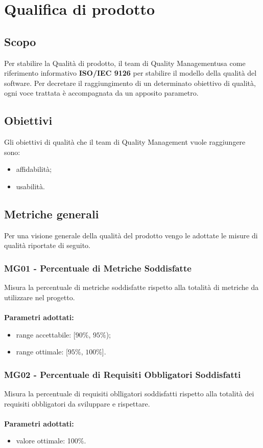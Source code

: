 \section{Qualifica di prodotto}
\subsection{Scopo}
Per stabilire la Qualità di prodotto, il team di Quality Management\glo usa come riferimento informativo \textbf{ISO/IEC 9126} per stabilire il modello della qualità del software. Per decretare il raggiungimento di un determinato obiettivo di qualità, ogni voce trattata è accompagnata da un apposito parametro.
\subsection{Obiettivi}
Gli obiettivi di qualità che il team di Quality Management vuole raggiungere sono:
\begin{itemize}
\item affidabilità;
\item usabilità.
\end{itemize}
\subsection{Metriche generali}
Per una visione generale della qualità del prodotto vengo le adottate le misure di qualità riportate di seguito.
\subsubsection{MG01 - Percentuale di Metriche Soddisfatte}
Misura la percentuale di metriche soddisfatte rispetto alla totalità di metriche da utilizzare nel progetto.\\ \\ 
\textbf{Parametri adottati:} 
\begin{itemize}
\item range accettabile: [$90\%$, $95\%$);
\item range ottimale: [$95\%$, $100\%$].
\end{itemize}
 
\subsubsection{MG02 - Percentuale di Requisiti Obbligatori Soddisfatti}
Misura la percentuale di requisiti oblligatori soddisfatti rispetto alla totalità dei requisiti obbligatori da sviluppare e rispettare.\\ \\ 
\textbf{Parametri adottati:} 
\begin{itemize}
\item valore ottimale: 100\%.
\end{itemize}

